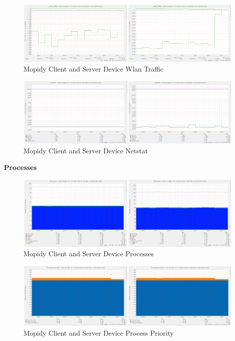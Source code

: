 \documentclass[11pt,a4paper,headinclude=false,footinclude=false]{scrreprt}
\begin{document}
\begin{figure}[H]
\includegraphics{ResultsAndAnalysis/MopidyServerTestImages/023MopidyWlan0Traffic.png}
\centering
\caption{Mopidy Client and Server Device Wlan Traffic}
\label{MopidyWlanTraffic}
\end{figure}

\begin{figure}[H]
\includegraphics{ResultsAndAnalysis/MopidyServerTestImages/018MopidyNetstat.png}
\centering
\caption{Mopidy Client and Server Device Netstat}
\label{MopidyNetstat}
\end{figure}

\textbf{Processes}

\begin{figure}[H]
\includegraphics{ResultsAndAnalysis/MopidyServerTestImages/020MopidyProcesses.png}
\centering
\caption{Mopidy Client and Server Device Processes}
\label{MopidyProcesses}
\end{figure}

\begin{figure}[H]
\includegraphics{ResultsAndAnalysis/MopidyServerTestImages/021MopidyProcessPriority.png}
\centering
\caption{Mopidy Client and Server Device Process Priority}
\label{MopidyProcessPriority}
\end{figure}
\end{document}
